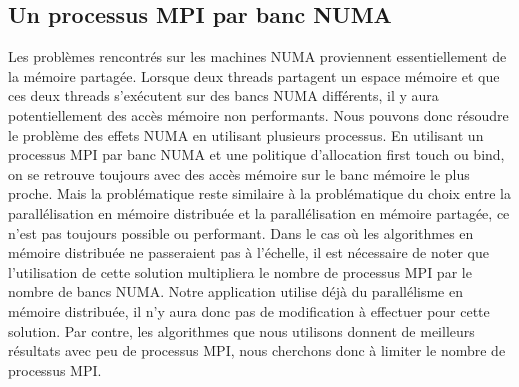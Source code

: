 \subsection{Un processus MPI par banc NUMA}
Les problèmes rencontrés sur les machines NUMA proviennent essentiellement de la mémoire partagée.
%
Lorsque deux threads partagent un espace mémoire et que ces deux threads s'exécutent sur des bancs NUMA différents, il y aura potentiellement des accès mémoire non performants.
%
Nous pouvons donc résoudre le problème des effets NUMA en utilisant plusieurs processus.
%
En utilisant un processus MPI par banc NUMA et une politique d'allocation first touch ou bind, on se retrouve toujours avec des accès mémoire sur le banc mémoire le plus proche.
%
Mais la problématique reste similaire à la problématique du choix entre la parallélisation en mémoire distribuée et la parallélisation en mémoire partagée, ce n'est pas toujours possible ou performant.
%
Dans le cas où les algorithmes en mémoire distribuée ne passeraient pas à l'échelle, il est nécessaire de noter que l'utilisation de cette solution multipliera le nombre de processus MPI par le nombre de bancs NUMA.
%
Notre application utilise déjà du parallélisme en mémoire distribuée, il n'y aura donc pas de modification à effectuer pour cette solution.
%
Par contre, les algorithmes que nous utilisons donnent de meilleurs résultats avec peu de processus MPI, nous cherchons donc à limiter le nombre de processus MPI.
